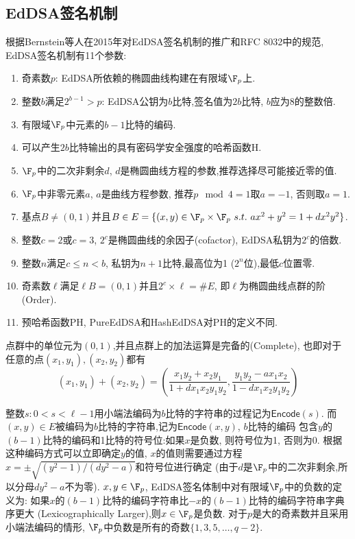 \subsection{EdDSA签名机制}

根据Bernstein等人在2015年对EdDSA签名机制的推广和RFC 8032中的规范, EdDSA签名机制有11个参数:
\begin{enumerate}
\item 
奇素数$p$: EdDSA所依赖的椭圆曲线构建在有限域$\F_p$上.
\item 
整数$b$满足$2^{b-1} > p$: EdDSA公钥为$b$比特,签名值为$2b$比特, $b$应为8的整数倍.
\item
有限域$\F_p$中元素的$b-1$比特的编码.
\item
可以产生$2b$比特输出的具有密码学安全强度的哈希函数\textsf{H}.
\item
$\F_p$中的二次非剩余$d$, $d$是椭圆曲线方程的参数,推荐选择尽可能接近零的值.
\item
$\F_p$中非零元素$a$, $a$是曲线方程参数, 推荐$p \mod 4=1$取$a=-1$, 否则取$a=1$.
\item 
基点$B \neq (0, 1)$并且$B \in E = \{(x,y) \in \F_p \times \F_p\ s.t.\ ax^2 + y^2 = 1 + dx^2y^2\}$.
\item
整数$c = 2$或$c = 3$, $2^c$是椭圆曲线的余因子(cofactor), EdDSA私钥为$2^c$的倍数.
\item
整数$n$满足$c \leq n < b$, 私钥为$n+1$比特,最高位为1 ($2^n$位),最低$c$位置零.
\item
奇素数$\ell$满足$\ell B = (0,1)$并且$2^c \times \ell = \# E$, 即$\ell$为椭圆曲线点群的阶(Order).
\item
预哈希函数\textsf{PH}, \textsf{PureEdDSA}和\textsf{HashEdDSA}对\textsf{PH}的定义不同.
\end{enumerate}
点群中的单位元为$(0,1)$,并且点群上的加法运算是完备的(Complete), 
也即对于任意的点$(x_1,y_1), (x_2, y_2)$都有
$$(x_1, y_1) + (x_2, y_2) = \left( \frac{x_1y_2 + x_2y_1}{1 + dx_1x_2y_1y_2}, 
\frac{y_1y_2 - ax_1x_2}{1-dx_1x_2y_1y_2}\right)$$

整数$s: 0 < s < \ell - 1$用小端法编码为$b$比特的字符串的过程记为$\textsf{Encode}(s)$.
而$(x,y)\in E$被编码为$b$比特的字符串,记为$\textsf{Encode}(x,y)$, $b$比特的编码
包含$y$的$(b-1)$比特的编码和1比特的符号位:如果$x$是负数, 则符号位为1, 否则为0.
根据这种编码方式可以立即确定$y$的值, $x$的值则需要通过方程
$x = \pm\sqrt{(y^2-1)/(dy^2-a)}$和符号位进行确定
(由于$d$是$\F_p$中的二次非剩余,所以分母$dy^2-a$不为零).
$x, y \in \F_p$, EdDSA签名体制中对有限域$\F_p$中的负数的定义为:
如果$x$的$(b-1)$比特的编码字符串比$-x$的$(b-1)$比特的编码字符串字典序更大
(Lexicographically Larger),则$x\in\F_p$是负数.
对于$p$是大的奇素数并且采用小端法编码的情形, $\F_p$中负数是所有的奇数$\{1, 3, 5, \ldots, q-2\}$.

